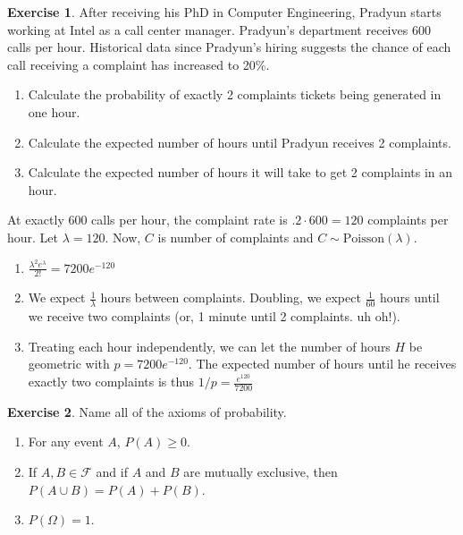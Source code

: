 \documentclass[12pt]{amsart}
\theoremstyle{definition}
\newtheorem{exercise}{Exercise}
\numberwithin{equation}{section}
\theoremstyle{plain}
\newcommand{\Poisson}{\text{Poisson}}
\begin{document}
 
\begin{exercise}
    After receiving his PhD in Computer Engineering, Pradyun starts working at Intel as a call center manager. Pradyun's department receives 600 calls per hour. Historical data since Pradyun's hiring suggests the chance of each call receiving a complaint has increased to 20\%. 
    \begin{enumerate}
    \item Calculate the probability of exactly 2 complaints tickets being generated in one hour. 
    \item Calculate the expected number of hours until Pradyun receives 2 complaints.
    \item Calculate the expected number of hours it will take to get 2 complaints in an hour.
    \end{enumerate}
    \begin{answer}
        At exactly $600$ calls per hour, the complaint rate is $.2\cdot 600 = 120$ complaints per hour. Let $\lambda = 120$. Now, $C$ is number of complaints and $C \sim \Poisson(\lambda)$.
        \begin{enumerate}
            \item $\frac{\lambda^2 e^{\lambda}}{2!} = 7200e^{-120}$
            \item We expect $\frac{1}{\lambda}$ hours between complaints. Doubling, we expect $\frac{1}{60}$ hours until we receive two complaints (or, 1 minute until 2 complaints. uh oh!).
            \item Treating each hour independently, we can let the number of hours $H$ be geometric with $p = 7200e^{-120}$. The expected number of hours until he receives exactly two complaints is thus $1/p = \frac{e^{120}}{7200}$
        \end{enumerate}
    \end{answer}
\end{exercise}

 

\begin{exercise}
Name all of the axioms of probability.
\begin{answer}
    \begin{enumerate}
        \item For any event $A$, $P(A) \geq 0$.
        \item If $A, B \in \mathcal{F}$ and if $A$ and $B$ are mutually exclusive, then $P(A \cup B) = P(A) + P(B)$.
        \item $P(\Omega) = 1$.
    \end{enumerate}
\end{answer}
\end{exercise}
\end{document}
